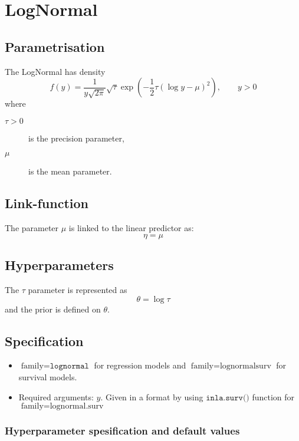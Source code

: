 \documentclass[a4paper,11pt]{article}
\begin{document}
\section*{LogNormal}

\subsection*{Parametrisation}

The LogNormal has density
\begin{displaymath}
    f(y) = \frac{1}{y\sqrt{2\pi}} \sqrt{\tau} \exp\left(
      -\frac{1}{2} \tau (\log y - \mu)^{2}
    \right), \qquad y > 0
\end{displaymath}
where
\begin{description}
\item[$\tau > 0$] is the precision parameter,
\item[$\mu$] is the mean parameter.
\end{description}

\subsection*{Link-function}

The parameter $\mu$ is linked to the linear predictor as:
\[
\eta = \mu
\]
\subsection*{Hyperparameters}

The $\tau$ parameter is represented as
\[
\theta = \log\tau
\]
and the prior is defined on $\theta$.

\subsection*{Specification}

\begin{itemize}
\item $\text{family}=\texttt{lognormal}$ for regression models and
    $\text{family}=\text{lognormalsurv}$ for survival models.
\item Required arguments: $y$. Given in a format by using
    $\texttt{inla.surv()}$ function for
    $\text{family}=\text{lognormal.surv}$
\end{itemize}

\subsubsection*{Hyperparameter spesification and default values}
\end{document}
